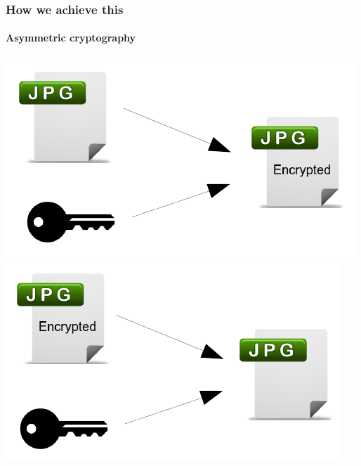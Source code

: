 \documentclass{beamer}
\begin{document}
  
	\begin{frame}
	\frametitle{How we achieve this}
	\framesubtitle{Asymmetric cryptography}
	\begin{center}
	\includegraphics[scale=0.7]{images/symmetricCrypt/encryption/encryption_scissored.pdf} \\
	\includegraphics[scale=0.7]{images/symmetricCrypt/decryption/decryption_scissored.pdf}
	\end{center}
	\end{frame}  
  
  
  
\end{document}
